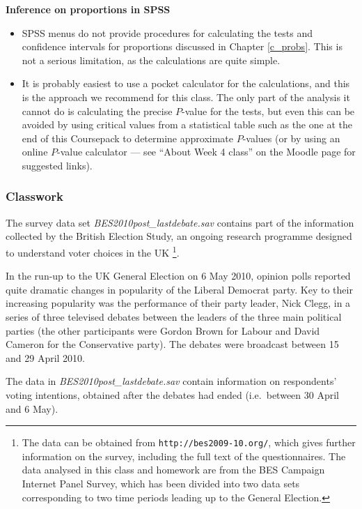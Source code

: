 \vspace*{1ex}
\textbf{Inference on proportions in SPSS}
\begin{itemize}
\item
SPSS menus do not provide procedures for calculating the tests
and confidence intervals for proportions discussed in Chapter \ref{c_probs}.
This is not a serious limitation, as the calculations are quite simple.
\item
It is probably easiest to use a pocket calculator for the calculations, and
this is the approach we recommend for this class.
The only part of the analysis it cannot do is calculating
the precise $P$-value for the tests, but even this can be avoided by
using critical values from a statistical table such as the one at the
end of this Coursepack to determine approximate $P$-values (or by using
an online $P$-value calculator --- see ``About Week 4 class'' on the
Moodle page for suggested links).
\end{itemize}

\subsubsection{Classwork}

The survey data set \emph{BES2010post\_lastdebate.sav} contains part of the
information collected by the British Election Study, an ongoing
research programme designed to understand voter choices in the UK
\footnote{The data can be obtained from
\texttt{http://bes2009-10.org/}, which gives further information on
the survey, including the full text of the questionnaires. The data
analysed in this class and homework are from the BES Campaign Internet Panel Survey,
which has been divided into two data sets corresponding to two time periods
leading up to the General Election.}.

In the run-up to the UK General Election on 6 May 2010, opinion polls reported quite dramatic
changes in popularity of the Liberal Democrat party. Key to their increasing popularity was the
 performance of their party leader, Nick Clegg, in a series of three televised debates
between the leaders of the three main political parties (the other participants were Gordon Brown
for Labour and David Cameron for the Conservative party). The debates were broadcast between
15 and 29 April 2010.

The data in \emph{BES2010post\_lastdebate.sav} contain information on respondents' voting intentions,
obtained after the debates had ended (i.e.\ between 30 April and 6 May).

